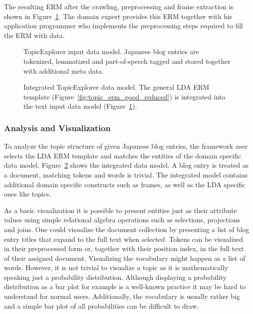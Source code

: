 The resulting ERM after the crawling, preprocessing and frame extraction is shown in Figure~\ref{fig:TopicExplorer_data_erm}. The domain expert provides this ERM together with his application programmer who implements the preprocessing steps required to fill the ERM with data.

\begin{figure}
\centering
\scalebox{\tikzScale}{\adjustTikzSize }
\caption[TopicExplorer input data model]{TopicExplorer input data model. Japanese blog entries are tokenized, lemmatized and part-of-speech tagged and stored together with additional meta data.}\label{fig:TopicExplorer_data_erm}
\end{figure}

\begin{figure}
\centering
\scalebox{0.7}{\adjustTikzSize }
\caption[Integrated TopicExplorer data model]{Integrated TopicExplorer data model. The general LDA ERM template (Figure~\ref{fig:topic_erm_good_reduced}) is integrated into the text input data model (Figure~\ref{fig:TopicExplorer_data_erm}).}\label{fig:TopicExplorer_integrated_erm}
\end{figure}

\subsubsection{Analysis and Visualization}
\label{subsec:casestudy_analysis}

To analyze the topic structure of given Japanese blog entries, the framework user selects the LDA ERM template and matches the entities of the domain specific data model. Figure~\ref{fig:TopicExplorer_integrated_erm} shows the integrated data model. A blog entry is treated as a document, matching tokens and words is trivial. The integrated model contains additional domain specific constructs such as frames, as well as the LDA specific ones like topics.

As a basic visualization it is possible to present entities just as their attribute values using simple relational algebra operations such as selections, projections and joins. One could visualize the document collection by presenting a list of blog entry titles that expand to the full text when selected. Tokens can be visualized in their preprocessed form or, together with their position index, in the full text of their assigned document. Visualizing the vocabulary might happen as a list of words. However, it is not trivial to visualize a topic as it is mathematically speaking just a probability distribution. Although displaying a probability distribution as a bar plot for example is a well-known practice it may be hard to understand for normal users. Additionally, the vocabulary is usually rather big and a simple bar plot of all probabilities can be difficult to draw.

